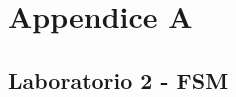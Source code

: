 \documentclass[11pt,  english, makeidx, a4paper, titlepage, oneside]{book}
\newenvironment{listato}{\footnotesize} {\normalsize }
\begin{document}
\chapter{Appendice A}
\section{Laboratorio 2 - FSM}
\begin{center}
\begin{listato}
	\centerline{}
\end{listato}
\end{center}
\end{document}
